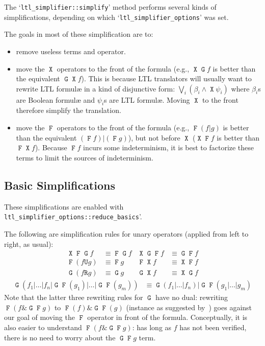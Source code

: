 \documentclass[a4paper,twoside,10pt,DIV=12,draft]{scrreprt}
\DeclareMathOperator{\F}{\texttt{F}}
\DeclareMathOperator{\G}{\texttt{G}}
\newcommand{\U}{\mathbin{\texttt{U}}}
\newcommand{\R}{\mathbin{\texttt{R}}}
\DeclareMathOperator{\X}{\texttt{X}}
\newcommand{\OR}{\mathbin{\texttt{|}}}
\newcommand{\AND}{\mathbin{\texttt{\&}}}
\newcommand{\0}{\texttt{0}}
\newcommand{\1}{\texttt{1}}
\begin{document}
The `\verb|ltl_simplifier::simplify|' method performs several kinds of
simplifications, depending on which `\verb|ltl_simplifier_options|'
was set.

The goals in most of these simplification are to:
\begin{itemize}
\item remove useless terms and operator.
\item move the $\X$ operators to the front of the formula (e.g., $\X\G
  f$ is better than the equivalent $\G\X f$).  This is because LTL
  translators will usually want to rewrite LTL formul\ae{} in
  a kind of disjunctive form: $\displaystyle\bigvee_i
  \left(\beta_i\land\X\psi_i\right)$ where $\beta_i$s are Boolean
  formul\ae{} and $\psi_i$s are LTL formul\ae{}.  Moving $\X$ to the
  front therefore simplify the translation.
\item move the $\F$ operators to the front of the formula (e.g., $\F(f
  \OR g)$ is better than the equivalent $(\F f)\OR (\F g)$), but not
  before $\X$ ($\X\F f$ is better than $\F\X f$).  Because $\F f$
  incurs some indeterminism, it is best to factorize these terms to
  limit the sources of indeterminism.
\end{itemize}

\subsection{Basic Simplifications}

These simplifications are enabled with
\verb|ltl_simplifier_options::reduce_basics|'.


The following are simplification rules for unary operators (applied
from left to right, as usual):
\begin{align*}
  \X\F\G f &\equiv \F\G f   & \X\G\F f &\equiv \G\F f \\
  \F(f\U g) &\equiv \F g     & \F\X f &\equiv \X\F f \\
  \G(f \R g) &\equiv \G g    & \G\X f &\equiv \X\G f
\end{align*}
\begin{align*}
  \G(f_1\OR\ldots\OR f_n \OR \G\F(g_1)\OR\ldots\OR \G\F(g_m))&\equiv \G(f_1\OR\ldots\OR f_n)\OR \G\F(g_1\OR\ldots\OR g_m)
\end{align*}
Note that the latter three rewriting rules for $\G$ have no dual:
rewriting $\F(f \AND \G\F g)$ to $\F(f) \AND \G\F(g)$ (instance as
suggested by~\citet{somenzi.00.cav}) goes against our goal of moving
the $\F$ operator in front of the formula.  Conceptually, it is also
easier to understand $\F(f \AND \G\F g)$: has long as $f$ has not been
verified, there is no need to worry about the $\G\F g$ term.
\end{document}
